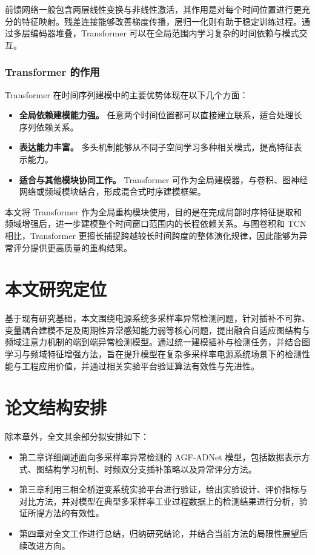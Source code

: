 \documentclass[bachelor, vlined]{DissertUESTC}
\begin{document}
    前馈网络一般包含两层线性变换与非线性激活，其作用是对每个时间位置进行更充分的特征映射。残差连接能够改善梯度传播，层归一化则有助于稳定训练过程。通过多层编码器堆叠，Transformer 可以在全局范围内学习复杂的时间依赖与模式交互。
    
    \subsubsection{Transformer 的作用}
    
    Transformer 在时间序列建模中的主要优势体现在以下几个方面：
    
    \begin{itemize}
        \item \textbf{全局依赖建模能力强。} 任意两个时间位置都可以直接建立联系，适合处理长序列依赖关系。
        \item \textbf{表达能力丰富。} 多头机制能够从不同子空间学习多种相关模式，提高特征表示能力。
        \item \textbf{适合与其他模块协同工作。} Transformer 可作为全局建模器，与卷积、图神经网络或频域模块结合，形成混合式时序建模框架。
    \end{itemize}
    
    本文将 Transformer 作为全局重构模块使用，目的是在完成局部时序特征提取和频域增强后，进一步建模整个时间窗口范围内的长程依赖关系。与图卷积和 TCN 相比，Transformer 更擅长捕捉跨越较长时间跨度的整体演化规律，因此能够为异常评分提供更高质量的重构结果。

	\section{本文研究定位}
	基于现有研究基础，本文围绕电源系统多采样率异常检测问题，针对插补不可靠、变量耦合建模不足及周期性异常感知能力弱等核心问题，提出融合自适应图结构与频域注意力机制的端到端异常检测模型。通过统一建模插补与检测任务，并结合图学习与频域特征增强方法，旨在提升模型在复杂多采样率电源系统场景下的检测性能与工程应用价值，并通过相关实验平台验证算法有效性与先进性。
    \section{论文结构安排}
    除本章外，全文其余部分拟安排如下：
    \begin{itemize}
        \item 第二章详细阐述面向多采样率异常检测的 AGF-ADNet 模型，包括数据表示方式、图结构学习机制、时频双分支插补策略以及异常评分方法。
        \item 第三章利用三相全桥逆变系统实验平台进行验证，给出实验设计、评价指标与对比方法，并对模型在典型多采样率工业过程数据上的检测结果进行分析，验证所提方法的有效性。
        \item 第四章对全文工作进行总结，归纳研究结论，并结合当前方法的局限性展望后续改进方向。
    \end{itemize}
\end{document}
